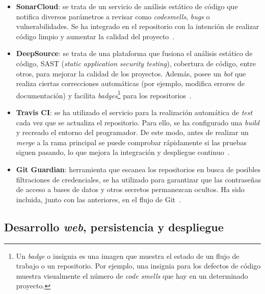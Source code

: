 \begin{itemize}
	\item \textbf{SonarCloud}: se trata de un servicio de análisis estático de código que notifica diversos parámetros a revisar como \textit{codesmells}, \textit{bugs} o vulnerabilidades. Se ha integrado en el repositorio con la intención de realizar código limpio y aumentar la calidad del proyecto~\cite{sonarCloud}.
	\item \textbf{DeepSource}: se trata de una plataforma que fusiona el análisis estático de código, SAST (\textit{static application security testing}), cobertura de código, entre otros, para mejorar la calidad de los proyectos. Además, posee un \textit{bot} que realiza ciertas correcciones automáticas (por ejemplo, modifica errores de documentación) y facilita \textit{badges}\footnote{Un \textit{badge} o insignia es una imagen que muestra el estado de un flujo de trabajo o un repositorio. Por ejemplo, una insignia para los defectos de código muestra visualmente el número de \textit{code smells} que hay en un determinado proyecto.} para los repositorios~\cite{deepSourceBot}.
	\item \textbf{Travis CI}: se ha utilizado el servicio para la realización automática de \textit{test} cada vez que se actualiza el repositorio. Para ello, se ha configurado una \textit{build} y recreado el entorno del programador. De este modo, antes de realizar un \textit{merge} a la rama principal se puede comprobar rápidamente si las pruebas siguen pasando, lo que mejora la integración y despliegue continuo~\cite{travisCI}.
	\item \textbf{Git Guardian}: herramienta que escanea los repositorios en busca de posibles filtraciones de credenciales, se ha utilizado para garantizar que las contraseñas de acceso a bases de datos y otros secretos permanezcan ocultos. Ha sido incluida, junto con las anteriores, en el flujo de Git~\cite{gitGuardian}.
\end{itemize}

\subsection{Desarrollo \textit{web}, persistencia y despliegue}
\label{sec:despliegue}

